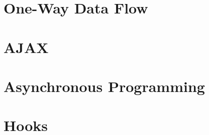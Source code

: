 \documentclass[b5paper,openany]{book}
\begin{document}
\chapter{One-Way Data Flow}




\chapter{AJAX}


\chapter{Asynchronous Programming}


\chapter{Hooks}






\end{document}
